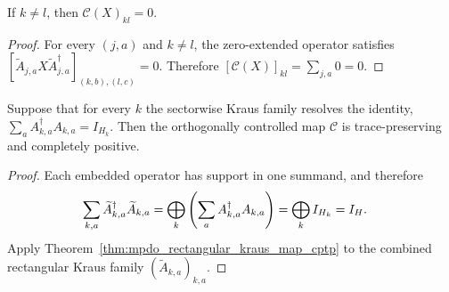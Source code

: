 \begin{theorem}
    \label{thm:mpdo_controlled_kraus_map_off_block}
    \leanok
    If $k\ne l$, then $\mathcal C(X)_{kl}=0$.
\end{theorem}
\begin{proof}
    \leanok
    For every $(j,a)$ and $k\ne l$, the zero-extended operator satisfies
    $[\widetilde A_{j,a}X\widetilde A_{j,a}^\dagger]_{(k,b),(l,c)}=0$.
    Therefore $[\mathcal C(X)]_{kl}=\sum_{j,a}0=0$.
\end{proof}

\begin{theorem}
    \label{thm:mpdo_controlled_kraus_map_cptp}
    \leanok
    Suppose that for every $k$ the sectorwise Kraus family resolves the
    identity, $\sum_a A_{k,a}^\dagger A_{k,a}=I_{H_k}$. Then the
    orthogonally controlled map $\mathcal C$ is trace-preserving and completely
    positive.
\end{theorem}
\begin{proof}
    \leanok
    Each embedded operator has support in one summand, and therefore
    \begin{align}
        \sum_{k,a}\widetilde A_{k,a}^\dagger\widetilde A_{k,a}
        &=\bigoplus_k\left(\sum_a A_{k,a}^\dagger A_{k,a}\right)
          =\bigoplus_k I_{H_k}=I_H.
        \notag
    \end{align}
    Apply Theorem~\ref{thm:mpdo_rectangular_kraus_map_cptp} to the combined
    rectangular Kraus family $(\widetilde A_{k,a})_{k,a}$.
\end{proof}

